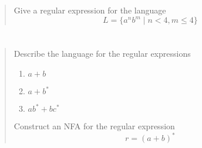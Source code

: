 \documentclass{article}
\begin{document}
\section{}
\begin{quote}
    Give a regular expression for the language
    \[L = \{a^n b^m \mid n < 4, m \leq 4\} \]
\end{quote}

\section{}
\begin{quote}
    Describe the language for the regular expressions
    \begin{enumerate}
        \item $a + b$
        \item $a + b^*$
        \item $ab^* + bc^*$
    \end{enumerate}
    Construct an NFA for the regular expression
    \[r = {(a + b)}^*\]
\end{quote}
\end{document}
